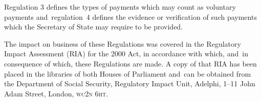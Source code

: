 \documentclass[12pt,a4paper]{article}
\begin{document}
Regulation 3 defines the types of payments which may count as voluntary payments and~regulation~4 defines the evidence or verification of such payments which the Secretary of State may require to be provided.

The impact on business of these Regulations was covered in the Regulatory Impact Assessment (RIA) for the 2000 Act, in accordance with which, and~in consequence of which, these Regulations are made. A copy of that RIA has been placed in the libraries of both Houses of Parliament and~can be obtained from the Department of Social Security, Regulatory Impact Unit, Adelphi, 1--11 John Adam Street, London, \textsc{\lowercase{WC2N 6HT}}. 
\end{document}
